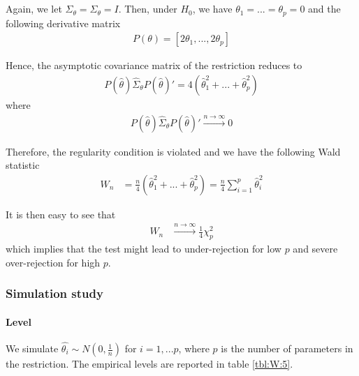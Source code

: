\documentclass[]{article}\usepackage[]{graphicx}\usepackage[]{color}
\begin{document}
Again, we let $\hat{\Sigma}_\theta=\Sigma_\theta=I$. Then, under $H_0$, we have $\theta_1=...=\theta_p=0$ and the following derivative matrix
\begin{align}
	P(\theta) = \left[2\theta_1, ... , 2\theta_p \right]
\end{align}

Hence, the asymptotic covariance matrix of the restriction reduces to
\begin{align}
	P(\hat{\theta})\hat{\Sigma}_\theta P(\hat{\theta})' = 4(\hat{\theta}_1^2+...+\hat{\theta}_p^2)
\end{align}
where
\begin{align}
	P(\hat{\theta})\hat{\Sigma}_\theta P(\hat{\theta})'\xrightarrow{n \rightarrow \infty} 0
\end{align}

Therefore, the regularity condition is violated and we have the following Wald statistic
\begin{align}
	W_n & = \frac{n}{4}( \hat{\theta}_1^2 + ... + \hat{\theta}_p^2) = \frac{n}{4} \sum_{i=1}^{p}\hat{\theta}_i^2
\end{align}

It is then easy to see that
\begin{align}
	W_n & \xrightarrow{n \rightarrow \infty}\frac{1}{4} \chi^2_p
\end{align}
which implies that the test might lead to under-rejection for low $p$ and severe over-rejection for high $p$.

\subsubsection{Simulation study}
\paragraph{Level}

We simulate $\hat{\theta_i} \sim N(0,\frac{1}{n})$ for $i=1,...p$, where $p$ is the number of parameters in the restriction. The empirical levels are reported in table \ref{tbl:W:5}.
\end{document}
